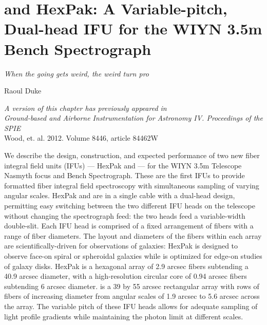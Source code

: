 \chapter[HexPak/\GP Construction]{\GP and HexPak: A Variable-pitch,
  Dual-head IFU for the WIYN 3.5m Bench Spectrograph}
\label{chap:pak_build}
\epigraph{\fixspacing\emph{When the going gets weird, the weird turn
    pro}}{Raoul Duke}


\vfill

\begin{flushright}
  \fixspacing
  \textit{A version of this chapter has previously appeared in\\
    \emph{Ground-based and Airborne Instrumentation for Astronomy IV. Proceedings of the SPIE}}\\
    \vspace{1ex}
    Wood, et. al. 2012. Volume 8446, article 84462W
\end{flushright}

\begin{chabstract}
  We describe the design, construction, and expected performance of two new
  fiber integral field units (IFUs) --- HexPak and \GP --- for the WIYN 3.5m
  Telescope Nasmyth focus and Bench Spectrograph.  These are the first IFUs to
  provide formatted fiber integral field spectroscopy with simultaneous sampling
  of varying angular scales.  HexPak and \GP are in a single cable with a
  dual-head design, permitting easy switching between the two different IFU
  heads on the telescope without changing the spectrograph feed: the two heads
  feed a variable-width double-slit.  Each IFU head is comprised of a fixed
  arrangement of fibers with a range of fiber diameters.  The layout and
  diameters of the fibers within each array are scientifically-driven for
  observations of galaxies: HexPak is designed to observe face-on spiral or
  spheroidal galaxies while \GP is optimized for edge-on studies of galaxy
  disks.  HexPak is a hexagonal array of 2.9 arcsec fibers subtending a 40.9
  arcsec diameter, with a high-resolution circular core of 0.94 arcsec fibers
  subtending 6 arcsec diameter.  \GP is a 39 by 55 arcsec rectangular array
  with rows of fibers of increasing diameter from angular scales of 1.9 arcsec
  to 5.6 arcsec across the array.  The variable pitch of these IFU heads allows
  for adequate sampling of light profile gradients while maintaining the photon
  limit at different scales.
\end{chabstract}
\cleardoublepage

